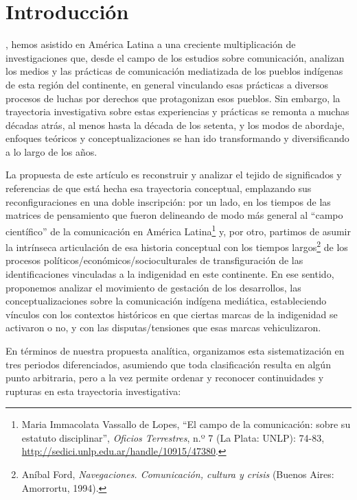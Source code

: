 \documentclass{tufte-handout}
\begin{document}
\vspace*{2em}

\hypertarget{introduccin}{%
\section{Introducción}\label{introduccin}}

, hemos asistido en América Latina a una creciente
multiplicación de investigaciones que, desde el campo de los estudios
sobre comunicación, analizan los medios y las prácticas de comunicación
mediatizada de los pueblos indígenas de esta región del continente, en
general vinculando esas prácticas a diversos procesos de luchas por
derechos que protagonizan esos pueblos. Sin embargo, la trayectoria
investigativa sobre estas experiencias y prácticas se remonta a muchas
décadas atrás, al menos hasta la década de los setenta, y los modos de
abordaje, enfoques teóricos y conceptualizaciones se han ido
transformando y diversificando a lo largo de los años.

La propuesta de este artículo es reconstruir y analizar el tejido de
significados y referencias de que está hecha esa trayectoria conceptual,
emplazando sus reconfiguraciones en una doble inscripción: por un lado,
en los tiempos de las matrices de pensamiento que fueron delineando de
modo más general al ``campo científico'' de la comunicación en América
Latina\footnote{Maria Immacolata Vassallo de Lopes, ``El campo de la
  comunicación: sobre su estatuto disciplinar'', \emph{Oficios
  Terrestres}, n.º 7 (La Plata: UNLP): 74-83,
  \url{http://sedici.unlp.edu.ar/handle/10915/47380}.} y, por otro,
partimos de asumir la intrínseca articulación de esa historia conceptual
con los tiempos largos\footnote{Aníbal Ford, \emph{Navegaciones.
  Comunicación, cultura y crisis} (Buenos Aires: Amorrortu, 1994).} de
los procesos políticos/económicos/socioculturales de transfiguración de
las identificaciones vinculadas a la indigenidad en este continente. En
ese sentido, proponemos analizar el movimiento de gestación de los
desarrollos, las conceptualizaciones sobre la comunicación indígena
mediática, estableciendo vínculos con los contextos históricos en que
ciertas marcas de la indigenidad se activaron o no, y con las
disputas/tensiones que esas marcas vehiculizaron.

En términos de nuestra propuesta analítica, organizamos esta
sistematización en tres periodos diferenciados, asumiendo que toda
clasificación resulta en algún punto arbitraria, pero a la vez permite
ordenar y reconocer continuidades y rupturas en esta trayectoria
investigativa:
\end{document}

